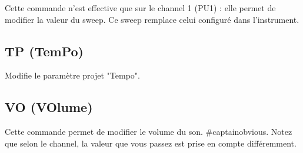 Cette commande n'est effective que sur le channel 1 (PU1) : elle permet de modifier la valeur du sweep.
Ce sweep remplace celui configuré dans l'instrument.

\subsection{TP (TemPo)}

Modifie le paramètre projet "Tempo".

\subsection{VO (VOlume)}

Cette commande permet de modifier le volume du son.
\#captainobvious.
Notez que selon le channel, la valeur que vous passez est prise en compte différemment.
